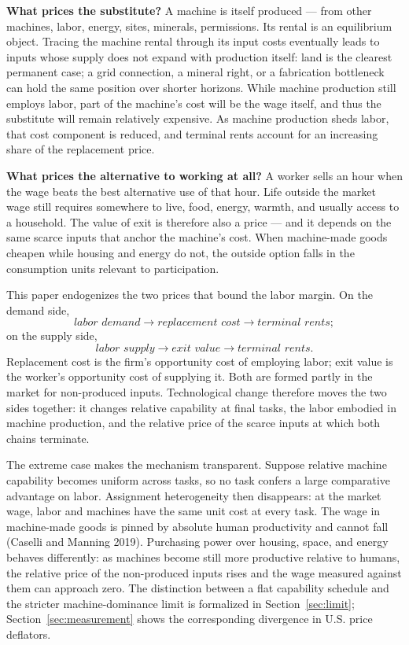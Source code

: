 \documentclass[12pt]{article}
\theoremstyle{plain}
\begin{document}
\textbf{What prices the substitute?} A machine is itself produced --- from other machines, labor, energy, sites, minerals, permissions. Its rental is an equilibrium object. Tracing the machine rental through its input costs eventually leads to inputs whose supply does not expand with production itself: land is the clearest permanent case; a grid connection, a mineral right, or a fabrication bottleneck can hold the same position over shorter horizons. While machine production still employs labor, part of the machine's cost will be the wage itself, and thus the substitute will remain relatively expensive. As machine production sheds labor, that cost component is reduced, and terminal rents account for an increasing share of the replacement price.

\textbf{What prices the alternative to working at all?} A worker sells an hour when the wage beats the best alternative use of that hour. Life outside the market wage still requires somewhere to live, food, energy, warmth, and usually access to a household. The value of exit is therefore also a price --- and it depends on the same scarce inputs that anchor the machine's cost. When machine-made goods cheapen while housing and energy do not, the outside option falls in the consumption units relevant to participation.

This paper endogenizes the two prices that bound the labor margin. On the demand side,
\[
\textit{labor demand} \to \textit{replacement cost} \to \textit{terminal rents};
\]
on the supply side,
\[
\textit{labor supply} \to \textit{exit value} \to \textit{terminal rents}.
\]
Replacement cost is the firm's opportunity cost of employing labor; exit value is the worker's opportunity cost of supplying it. Both are formed partly in the market for non-produced inputs. Technological change therefore moves the two sides together: it changes relative capability at final tasks, the labor embodied in machine production, and the relative price of the scarce inputs at which both chains terminate.

The extreme case makes the mechanism transparent. Suppose relative machine capability becomes uniform across tasks, so no task confers a large comparative advantage on labor. Assignment heterogeneity then disappears: at the market wage, labor and machines have the same unit cost at every task. The wage in machine-made goods is pinned by absolute human productivity and cannot fall (Caselli and Manning 2019). Purchasing power over housing, space, and energy behaves differently: as machines become still more productive relative to humans, the relative price of the non-produced inputs rises and the wage measured against them can approach zero. The distinction between a flat capability schedule and the stricter machine-dominance limit is formalized in Section~\ref{sec:limit}; Section~\ref{sec:measurement} shows the corresponding divergence in U.S. price deflators.
\end{document}
